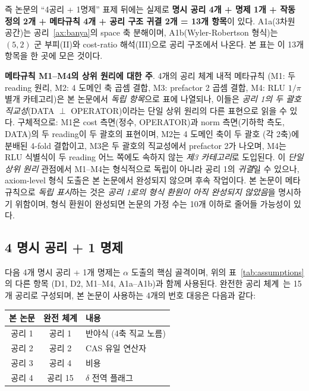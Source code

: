 \documentclass[entropy,article,submit,pdftex,oneauthor]{Definitions/mdpi}
\begin{document}
즉 논문의 ``4공리 + 1명제'' 표제 뒤에는 실제로 \textbf{명시 공리 4개 + 명제 1개 + 작동 정의 2개 + 메타규칙 4개 + 공리 구조 귀결 2개 = 13개 항목}이 있다. A1a(3차원 공간)는 공리~\ref{ax:banya}의 space 축 분해이며, A1b(Wyler-Robertson 형식)는 $(5,2)$ 군 부피(II)와 cost-ratio 해석(III)으로 공리 구조에서 나온다. 본 표는 이 13개 항목을 한 곳에 모은 것이다.

\textbf{메타규칙 M1--M4의 상위 원리에 대한 주}. 4개의 공리 체계 내적 메타규칙 (M1: 두 reading 원리, M2: 4 도메인 축 곱셈 결합, M3: prefactor 2 곱셈 결합, M4: RLU $1/\pi$ 별개 카테고리)은 본 논문에서 \emph{독립 항목}으로 표에 나열되나, 이들은 \emph{공리 1의 두 괄호 직교성}(DATA $\perp$ OPERATOR)이라는 단일 상위 원리의 다른 표현으로 읽을 수 있다. 구체적으로: M1은 cost 측면(정수, OPERATOR)과 norm 측면(기하학 측도, DATA)의 두 reading이 두 괄호의 표현이며, M2는 4 도메인 축이 두 괄호 (각 2축)에 분배된 4-fold 결합이고, M3은 두 괄호의 직교성에서 prefactor 2가 나오며, M4는 RLU 식별식이 두 reading 어느 쪽에도 속하지 않는 \emph{제3 카테고리}로 도입된다. 이 \emph{단일 상위 원리} 관점에서 M1--M4는 형식적으로 독립이 아니라 공리 1의 \emph{귀결}일 수 있으나, axiom-level 형식 도출은 본 논문에서 완성되지 않으며 후속 작업이다. 본 논문이 메타규칙으로 \emph{독립 표시}하는 것은 \emph{공리 1로의 형식 환원이 아직 완성되지 않았음}을 명시하기 위함이며, 형식 환원이 완성되면 논문의 가정 수는 10개 이하로 줄어들 가능성이 있다.

\subsection{4 명시 공리 + 1 명제}

다음 4개 명시 공리 + 1개 명제는 $\alpha$ 도출의 핵심 골격이며, 위의 표~\ref{tab:assumptions}의 다른 항목 (D1, D2, M1--M4, A1a--A1b)과 함께 사용된다. 완전한 공리 체계~\cite{han2026}는 15개 공리로 구성되며, 본 논문이 사용하는 4개의 번호 대응은 다음과 같다:

\begin{center}
\footnotesize
\begin{tabular}{ccl}
\toprule
\textbf{본 논문} & \textbf{완전 체계} & \textbf{내용} \\
\midrule
공리 1 & 공리 1 & 반야식 (4축 직교 노름) \\
공리 2 & 공리 2 & CAS 유일 연산자 \\
공리 3 & 공리 4 & 비용 \\
공리 4 & 공리 15 & $\delta$ 전역 플래그 \\
\bottomrule
\end{tabular}
\end{center}
\end{document}
